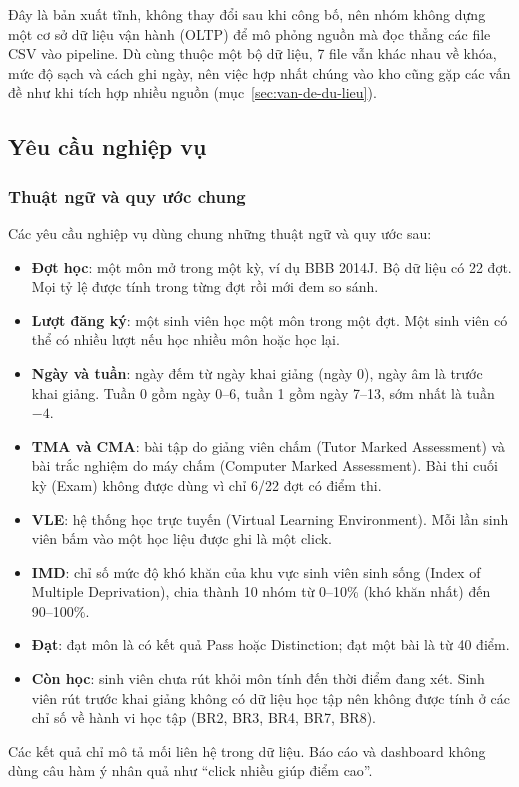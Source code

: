 Đây là bản xuất tĩnh, không thay đổi sau khi công bố, nên nhóm không dựng một cơ sở dữ liệu
vận hành (OLTP) để mô phỏng nguồn mà đọc thẳng các file CSV vào pipeline. Dù cùng thuộc một bộ dữ liệu,
7 file vẫn khác nhau về khóa, mức độ sạch và cách ghi ngày, nên việc hợp nhất chúng vào kho
cũng gặp các vấn đề như khi tích hợp nhiều nguồn (mục~\ref{sec:van-de-du-lieu}).

\subsection{Yêu cầu nghiệp vụ}
\label{sec:br}

\subsubsection{Thuật ngữ và quy ước chung}
Các yêu cầu nghiệp vụ dùng chung những thuật ngữ và quy ước sau:
\begin{itemize}
  \item \textbf{Đợt học}: một môn mở trong một kỳ, ví dụ BBB 2014J. Bộ dữ liệu có 22 đợt.
        Mọi tỷ lệ được tính trong từng đợt rồi mới đem so sánh.
  \item \textbf{Lượt đăng ký}: một sinh viên học một môn trong một đợt. Một sinh viên
        có thể có nhiều lượt nếu học nhiều môn hoặc học lại.
  \item \textbf{Ngày và tuần}: ngày đếm từ ngày khai giảng (ngày 0), ngày âm là trước
        khai giảng. Tuần 0 gồm ngày 0--6, tuần 1 gồm ngày 7--13, sớm nhất là tuần $-4$.
  \item \textbf{TMA và CMA}: bài tập do giảng viên chấm (Tutor Marked Assessment) và bài
        trắc nghiệm do máy chấm (Computer Marked Assessment). Bài thi cuối kỳ (Exam)
        không được dùng vì chỉ 6/22 đợt có điểm thi.
  \item \textbf{VLE}: hệ thống học trực tuyến (Virtual Learning Environment). Mỗi lần
        sinh viên bấm vào một học liệu được ghi là một click.
  \item \textbf{IMD}: chỉ số mức độ khó khăn của khu vực sinh viên sinh sống (Index of
        Multiple Deprivation), chia thành 10 nhóm từ 0--10\% (khó khăn nhất) đến 90--100\%.
  \item \textbf{Đạt}: đạt môn là có kết quả Pass hoặc Distinction; đạt một bài là từ 40 điểm.
  \item \textbf{Còn học}: sinh viên chưa rút khỏi môn tính đến thời điểm đang xét. Sinh viên
        rút trước khai giảng không có dữ liệu học tập nên không được tính ở các chỉ số
        về hành vi học tập (BR2, BR3, BR4, BR7, BR8).
\end{itemize}
Các kết quả chỉ mô tả mối liên hệ trong dữ liệu. Báo cáo và dashboard không dùng câu
hàm ý nhân quả như ``click nhiều giúp điểm cao''.


